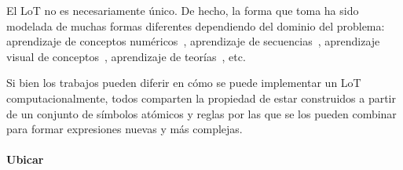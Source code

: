 {%

El LoT no es necesariamente único. De hecho, la forma que toma ha sido modelada de muchas formas diferentes dependiendo del dominio del problema: aprendizaje de conceptos numéricos~\cite{piantadosi2012bootstrapping}, aprendizaje de secuencias~\cite{amalric2017language,yildirim2015learning,romano2013language}, aprendizaje visual de conceptos~\cite{ellis2015unsupervised}, aprendizaje de teorías~\cite{ullman2012theory}, etc.


Si bien los trabajos pueden diferir en cómo se puede implementar un LoT computacionalmente, todos comparten la propiedad de estar construidos a partir de un conjunto de símbolos atómicos y reglas por las que se los pueden combinar para formar expresiones nuevas y más complejas.
}

\paragraph{Ubicar}


